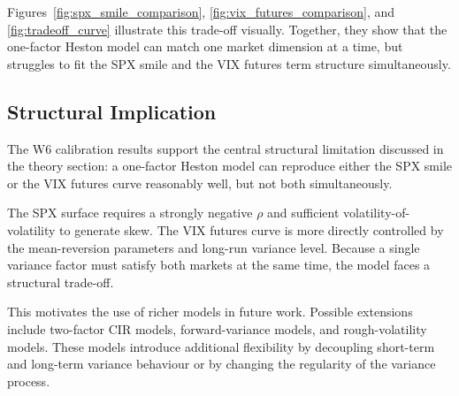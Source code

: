 Figures~\ref{fig:spx_smile_comparison}, \ref{fig:vix_futures_comparison}, and \ref{fig:tradeoff_curve} illustrate this trade-off visually. Together, they show that the one-factor Heston model can match one market dimension at a time, but struggles to fit the SPX smile and the VIX futures term structure simultaneously.

\subsection{Structural Implication}

The W6 calibration results support the central structural limitation discussed in the theory section: a one-factor Heston model can reproduce either the SPX smile or the VIX futures curve reasonably well, but not both simultaneously.

The SPX surface requires a strongly negative \(\rho\) and sufficient volatility-of-volatility to generate skew. The VIX futures curve is more directly controlled by the mean-reversion parameters and long-run variance level. Because a single variance factor must satisfy both markets at the same time, the model faces a structural trade-off.

This motivates the use of richer models in future work. Possible extensions include two-factor CIR models, forward-variance models, and rough-volatility models. These models introduce additional flexibility by decoupling short-term and long-term variance behaviour or by changing the regularity of the variance process.